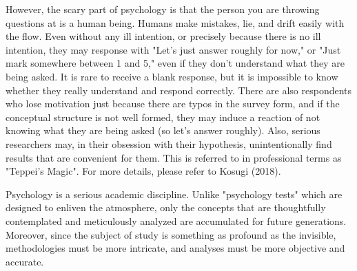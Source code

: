 \documentclass{ltjbook}
\begin{document}
However, the scary part of psychology is that the person you are throwing questions at is a human being. Humans make mistakes, lie, and drift easily with the flow. Even without any ill intention, or precisely because there is no ill intention, they may response with "Let's just answer roughly for now," or "Just mark somewhere between 1 and 5," even if they don't understand what they are being asked. It is rare to receive a blank response, but it is impossible to know whether they really understand and respond correctly. There are also respondents who lose motivation just because there are typos in the survey form, and if the conceptual structure is not well formed, they may induce a reaction of not knowing what they are being asked (so let's answer roughly). Also, serious researchers may, in their obsession with their hypothesis, unintentionally find results that are convenient for them. This is referred to in professional terms as "Teppei's Magic". For more details, please refer to Kosugi (2018).

Psychology is a serious academic discipline. Unlike "psychology tests" which are designed to enliven the atmosphere, only the concepts that are thoughtfully contemplated and meticulously analyzed are accumulated for future generations. Moreover, since the subject of study is something as profound as the invisible, methodologies must be more intricate, and analyses must be more objective and accurate.
\end{document}
